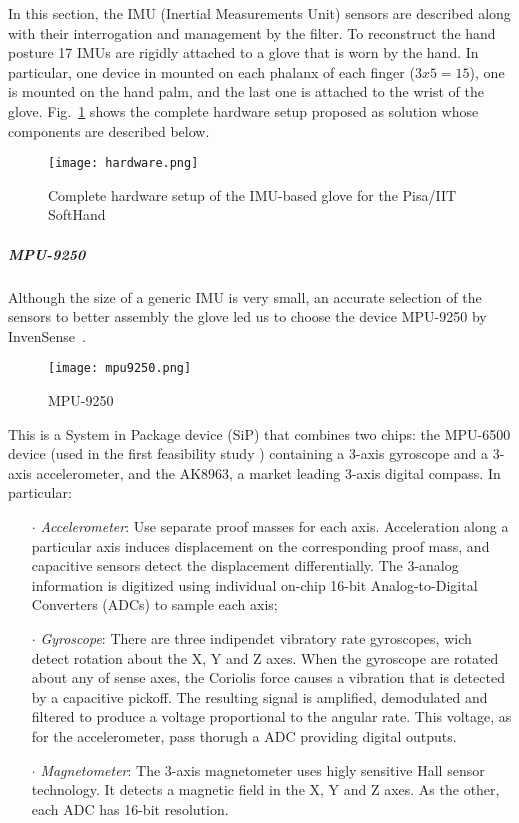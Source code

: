 In this section, the IMU (Inertial Measurements Unit) sensors are described along with their interrogation and management by the filter. 
To reconstruct the hand posture 17 IMUs are rigidly attached to a glove that is worn by the hand. In particular, one device in mounted on each phalanx of each finger ($3x5=15$), one is mounted on the hand palm, and the last one is attached to the wrist of the glove. Fig.~\ref{fig:hardware} shows the complete hardware setup proposed as solution whose components are described below.
\begin{figure}[h]
\centering
\texttt{[image: hardware.png]}
\caption{Complete hardware setup of the IMU-based glove for the Pisa/IIT SoftHand}
\label{fig:hardware}
\end{figure}



\subparagraph{MPU-9250}

Although the size of a generic IMU is very small, an accurate selection of the sensors to better assembly the glove led us to choose the device MPU-9250 by InvenSense~\cite{MPU9250}. 

\begin{figure}[h]
\centering
\texttt{[image: mpu9250.png]}
\caption{MPU-9250}
\label{fig:mpu9250}
\end{figure}

This is a System in Package device (SiP) that combines two chips: the MPU-6500 device (used in the first feasibility study \cite{Santaera:ICRA:2015}) containing a 3-axis gyroscope and a 3-axis accelerometer, and the AK8963, a market leading 3-axis digital compass. In particular:

\begin{itemize}
\item[$\cdot$] \textit{Accelerometer}: Use separate proof masses for each axis. Acceleration along a particular axis induces displacement on the corresponding proof mass, and capacitive sensors detect the displacement differentially. The 3-analog information is digitized using individual on-chip 16-bit Analog-to-Digital Converters (ADCs) to sample each axis;

 \item[$\cdot$] \textit{Gyroscope}: There are three indipendet vibratory rate gyroscopes, wich detect rotation about the X, Y and Z axes. When the gyroscope are rotated about any of sense axes, the Coriolis force causes a vibration that is detected by a capacitive pickoff. The resulting signal is amplified, demodulated and filtered to produce a voltage proportional to the angular rate. This voltage, as for the accelerometer, pass thorugh a ADC providing digital outputs.

 \item[$\cdot$] \textit{Magnetometer}: The 3-axis magnetometer uses higly sensitive Hall sensor technology. It detects a magnetic field in the X, Y and Z axes. As the other, each ADC has 16-bit resolution.
\end{itemize}

